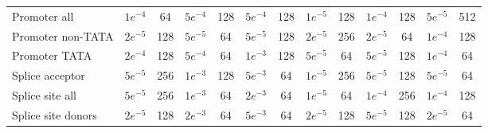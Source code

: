 \begin{table*}[!htb]
\begin{tabular}{@{}l*{12}{c}@{}}
Promoter all & $1e^{-4}$ & 64 & $5e^{-4}$ & 128 & $5e^{-4}$ & 128 & $1e^{-5}$ & 128 & $1e^{-4}$ & 128 & $5e^{-5}$ & 512 \\
Promoter non-TATA & $2e^{-5}$ & 128 & $5e^{-5}$ & 64 & $5e^{-5}$ & 128 & $2e^{-5}$ & 256 & $2e^{-5}$ & 64 & $1e^{-4}$ & 128 \\
Promoter TATA & $2e^{-4}$ & 128 & $5e^{-4}$ & 64 & $1e^{-3}$ & 128 & $5e^{-5}$ & 64 & $5e^{-5}$ & 128 & $1e^{-4}$ & 64 \\
Splice acceptor & $5e^{-5}$ & 256 & $1e^{-3}$ & 128 & $5e^{-3}$ & 64 & $1e^{-5}$ & 256 & $5e^{-5}$ & 128 & $5e^{-5}$ & 64 \\
Splice site all & $5e^{-5}$ & 256 & $1e^{-3}$ & 64 & $2e^{-3}$ & 64 & $1e^{-5}$ & 64 & $1e^{-4}$ & 256 & $1e^{-4}$ & 128 \\
Splice site donors & $2e^{-5}$ & 128 & $2e^{-3}$ & 64 & $5e^{-3}$ & 64 & $2e^{-5}$ & 128 & $5e^{-5}$ & 128 & $2e^{-5}$ & 64 \\
\bottomrule
\end{tabular}
\label{tab:benchmark_hyperparam2}
\end{table*}


